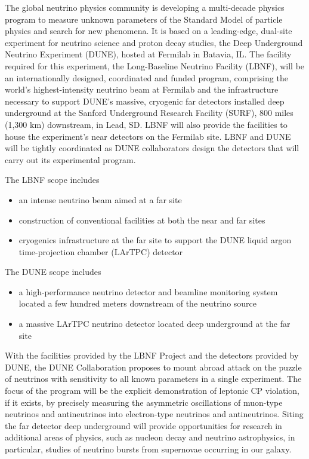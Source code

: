 

The global neutrino physics community is developing a multi-decade physics program to measure unknown parameters of the Standard Model of particle physics and search for new phenomena.   It is based on a leading-edge, dual-site experiment
for neutrino science and proton decay studies, the Deep Underground Neutrino Experiment 
(DUNE), hosted at Fermilab in Batavia, IL. The facility required for this experiment, the Long-Baseline 
Neutrino Facility (LBNF), will be an internationally designed, coordinated and funded program, comprising 
the world's highest-intensity neutrino beam at Fermilab and the infrastructure necessary to support 
DUNE's massive, cryogenic far detectors installed deep underground at the Sanford Underground 
Research Facility (SURF), 800 miles (1,300 km) downstream, in Lead, SD. LBNF will also provide the 
facilities to house the experiment's near detectors on the Fermilab site. LBNF and DUNE will be tightly coordinated as DUNE collaborators design the detectors that will carry out its experimental program. 
  
The LBNF scope includes 
\begin{itemize}
\item an intense neutrino beam aimed at a far site
\item construction of conventional facilities at both the near and far sites
\item cryogenics infrastructure at the far site to support the DUNE liquid argon time-projection
chamber (LArTPC) detector
\end{itemize}

The DUNE scope includes
\begin{itemize}
\item %
a high-performance neutrino detector and beamline monitoring system located a few hundred meters downstream of the neutrino source
\item a massive LArTPC neutrino detector located deep underground at the far site
\end{itemize}

With the facilities provided by the LBNF Project and the detectors provided by DUNE, the DUNE %
Collaboration proposes to mount abroad attack on the %
puzzle of neutrinos with sensitivity 
to all known parameters in a single experiment.  The focus of the program will be the explicit 
demonstration of leptonic CP violation, if it exists, by precisely measuring the asymmetric oscillations of 
muon-type neutrinos and antineutrinos into electron-type neutrinos and antineutrinos.
Siting the far detector deep underground will provide
opportunities for research in additional areas of physics, such as nucleon decay and neutrino
astrophysics, in particular, studies of neutrino bursts from supernovae occurring in our galaxy.

